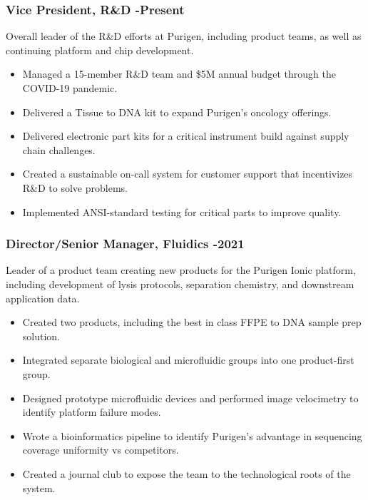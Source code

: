 \documentclass{res}
\begin{document}
\begin{resume}
    \subsubsection{Vice President, R\&D -Present}
      \vspace{-0.1in}
      Overall leader of the R\&D efforts at Purigen, including product teams, as well as
      continuing platform and chip development.
      \vspace{0.1in}
       \begin{itemize}
        \item Managed a 15-member R\&D team and \$5M annual budget through the COVID-19 pandemic.
        \item Delivered a Tissue to DNA kit to expand Purigen's oncology offerings.
        \item Delivered electronic part kits for a critical instrument build against supply chain challenges.
        \item Created a sustainable on-call system for customer support that incentivizes R\&D to solve problems.
        \item Implemented ANSI-standard testing for critical parts to improve quality.
       \end{itemize}

    \subsubsection{Director/Senior Manager, Fluidics -2021}
      \vspace{-0.1in}
      Leader of a product team creating new products for the Purigen Ionic platform,
      including development of lysis protocols, separation chemistry, and downstream application data.
      \vspace{0.1in}
       \begin{itemize}
        \item Created two products, including the best in class FFPE to DNA sample prep solution.
        \item Integrated separate biological and microfluidic groups into one product-first group.
        \item Designed prototype microfluidic devices and performed image velocimetry to identify platform failure modes.
        \item Wrote a bioinformatics pipeline to identify Purigen's advantage in sequencing coverage uniformity vs competitors.
        \item Created a journal club to expose the team to the technological roots of the system.
       \end{itemize}


\end{resume}
\end{document}
